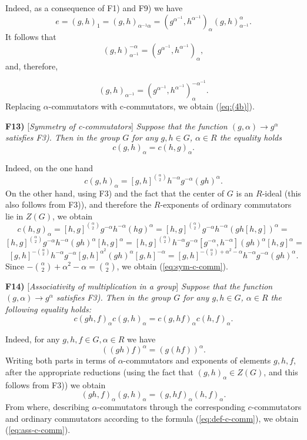 \documentclass[11pt]{article}
\theoremstyle{definition}
\begin{document}
Indeed, as a consequence of F1) and F9) we have
$$e=(g,h)_1=(g,h)_{\alpha^{-1}\alpha} = (g^{\alpha^{-1}},h^{\alpha^{-1}})_\alpha(g,h)^\alpha_{\alpha^{-1}}.
$$
It follows that
$$
(g,h)^{-\alpha}_{\alpha^{-1}}=(g^{\alpha^{-1}},h^{\alpha^{-1}})_\alpha,
$$
and, therefore,

\begin{equation}\label{eq:(4)}
    (g,h)_{\alpha^{-1}}=(g^{\alpha^{-1}},h^{\alpha^{-1}})_\alpha^{-\alpha^{-1}}.
\end{equation}
Replacing $\alpha$-commutators with c-commutators, we obtain (\ref{eq:(4b)}).
 

\medskip
\noindent
{\bf F13)} [{\it  Symmetry of c-commutators}]  {\it Suppose that the function $(g,\alpha) \to g^\alpha$ satisfies F3). Then in the group $G$ for any $g,h \in G$, $\alpha \in R$ the equality holds}
\begin{equation} \label{eq:sym-c-comm}
c(g,h)_\alpha = c(h,g)_\alpha.
\end{equation}

Indeed, on the one hand
$$
c(g,h)_\alpha = [g,h]^{\binom{\alpha}{2}}h^{-\alpha}g^{-\alpha}(gh)^\alpha.
$$
On the other hand, using F3) and the fact that the center of $G$ is an $R$-ideal (this also follows from F3)), and therefore the $R$-exponents of ordinary commutators lie in $Z(G)$, we obtain
$$
c(h,g)_\alpha = [h,g]^{\binom{\alpha}{2}}g^{-\alpha}h^{-\alpha}(hg)^\alpha = [h,g]^{\binom{\alpha}{2}}g^{-\alpha}h^{-\alpha}(gh[h,g])^\alpha =
$$
$$
[h,g]^{\binom{\alpha}{2}}g^{-\alpha}h^{-\alpha}(gh)^\alpha[h,g]^\alpha = [h,g]^{\binom{\alpha}{2}}h^{-\alpha}g^{-\alpha}[g^{-\alpha},h^{-\alpha}](gh)^\alpha[h,g]^\alpha =
$$
$$
[g,h]^{-\binom{\alpha}{2}}h^{-\alpha}g^{-\alpha}[g,h]^{\alpha^2}(gh)^\alpha[g,h]^{-\alpha} = [g,h]^{-\binom{\alpha}{2} +\alpha^2 -\alpha}h^{-\alpha}g^{-\alpha}(gh)^\alpha.
$$
Since $-\binom{\alpha}{2} +\alpha^2 -\alpha = \binom{\alpha}{2}$, we obtain
(\ref{eq:sym-c-comm}).


\medskip
\noindent
{\bf F14)} [{\it  Associativity of multiplication in a group}]  {\it Suppose that the function $(g,\alpha) \to g^\alpha$ satisfies F3). Then in the group $G$ for any $g,h \in G$, $\alpha \in R$ the following equality holds:}
\begin{equation} \label{eq:ass-c-comm}
 c(gh,f)_\alpha c(g,h)_\alpha =c(g,hf)_\alpha c(h,f)_\alpha.
\end{equation}

Indeed, for any $g,h,f \in G, \alpha \in R$ we have
$$
((gh)f)^\alpha = (g(hf))^\alpha.
$$
Writing both parts in terms of $\alpha$-commutators and exponents of elements $g,h,f$, after the appropriate reductions (using the fact that $(g,h)_\alpha \in Z(G)$, and this follows from F3)) we obtain
\begin{equation} \label{eq:ass}
 (gh,f)_\alpha (g,h)_\alpha =(g,hf)_\alpha  (h,f)_\alpha.
\end{equation}
From where, describing $\alpha$-commutators through the corresponding $c$-commutators and ordinary commutators according to the formula (\ref{eq:def-c-comm}), we obtain (\ref{eq:ass-c-comm}).
\end{document}
